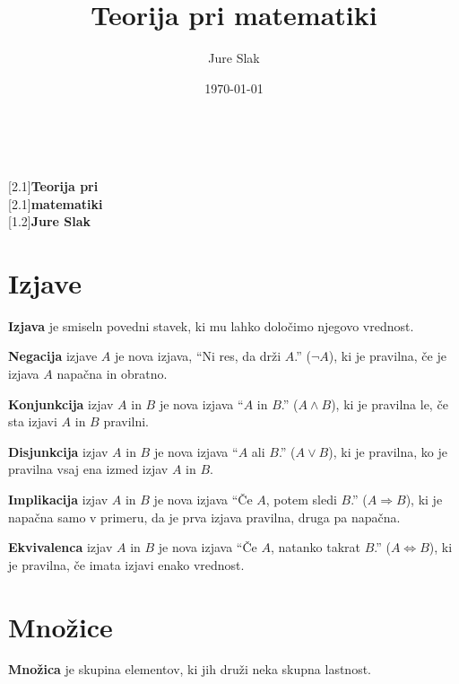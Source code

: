 \documentclass[a4paper,oneside,12pt,fleqn]{article}
\title{Teorija pri matematiki}
\author{Jure Slak}
\date{\today}
\renewcommand\implies\Rightarrow
\renewcommand\iff\Leftrightarrow
\numberwithin{equation}{section}
\begin{document}
\setlength{\abovedisplayskip}{3pt}
\setlength{\belowdisplayskip}{6pt}

\renewcommand{\listfigurename}{Kazalo slik} 

\thispagestyle{empty}

\mbox{}\\
\vspace{3ex}

\noindent \scalebox{1.8}[2.1]{\textsf{{\Huge \bfseries Teorija pri}}} \\[5pt]
\scalebox{1.8}[2.1]{\textsf{{\Huge \bfseries matematiki}}} \\[60pt]
\scalebox{1}[1.2]{\textsf{\Huge \bfseries Jure Slak}}

\vspace{50pt}
\noindent \mbox{} \hspace{-20pt} 
\pagebreak

\thispagestyle{empty}
\tableofcontents
\pagebreak

\section{Izjave}
\label{sec:izjave}
\textbf{Izjava} je smiseln povedni stavek, ki mu lahko določimo njegovo vrednost.

\textbf{Negacija} izjave $A$ je nova izjava, ``Ni res, da drži $A$.'' ($\neg A$), ki je pravilna, če je izjava $A$
napačna in obratno. 

\textbf{Konjunkcija} izjav $A$ in $B$ je nova izjava ``$A$ in $B$.'' ($A \land
B$), ki je pravilna le, če sta izjavi $A$ in $B$ pravilni.

\textbf{Disjunkcija} izjav $A$ in $B$ je nova izjava ``$A$ ali $B$.'' ($A \lor B$), 
ki je pravilna, ko je pravilna vsaj ena izmed izjav $A$ in $B$.

\textbf{Implikacija} izjav $A$ in $B$ je nova izjava ``Če $A$, potem sledi $B$.'' ($A
\implies B$), ki je napačna samo v primeru, da je prva izjava pravilna, druga pa napačna.

\textbf{Ekvivalenca} izjav $A$ in $B$ je nova izjava ``Če $A$, natanko takrat $B$.'' ($A 
\iff B$), ki je pravilna, če imata izjavi enako vrednost.

\section{Množice}
\label{sec:mnozice}
\textbf{Množica} je skupina elementov, ki jih druži neka skupna lastnost. 
\end{document}
